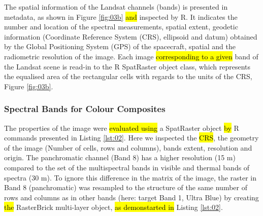 \documentclass[jimaging,article,submit,pdftex,moreauthors]{Definitions/mdpi}
\begin{document}
The spatial information of the Landsat channels (bands) is presented in metadata, as shown in Figure \ref{fig:03b} \hl{and} inspected by R. It indicates the number and location of the spectral measurements, spatial extent, geodetic information (Coordinate Reference System (CRS), ellipsoid and datum) obtained by the Global Positioning System (GPS) of the spacecraft, spatial and the radiometric resolution of the image. Each image \hl{corresponding to a given} band of the Landsat scene is read-in to the R SpatRaster object class, which represents the equalised area of the rectangular cells with regards to the units of the CRS, Figure \ref{fig:03b}. 

\subsubsection{Spectral Bands for Colour Composites}

The properties of the image were \hl{evaluated using} a SpatRaster object \hl{by} R commands presented in Listing \ref{lst:02}. Here we inspected the \hl{CRS}, the geometry of the image (Number of cells, rows and columns), bands extent, resolution and origin. The panchromatic channel (Band 8) has a higher resolution (15 m) compared to the set of the multispectral bands in visible and thermal bands of spectra (30 m). To ignore this difference in the matrix of the image, the raster in Band 8 (panchromatic) was resampled to the structure of the same number of rows and columns as in other bands (here: target Band 1, Ultra Blue) by creating \hl{the} RasterBrick multi-layer object, \hl{as demonstarted in} Listing \ref{lst:02}. 
\end{document}
